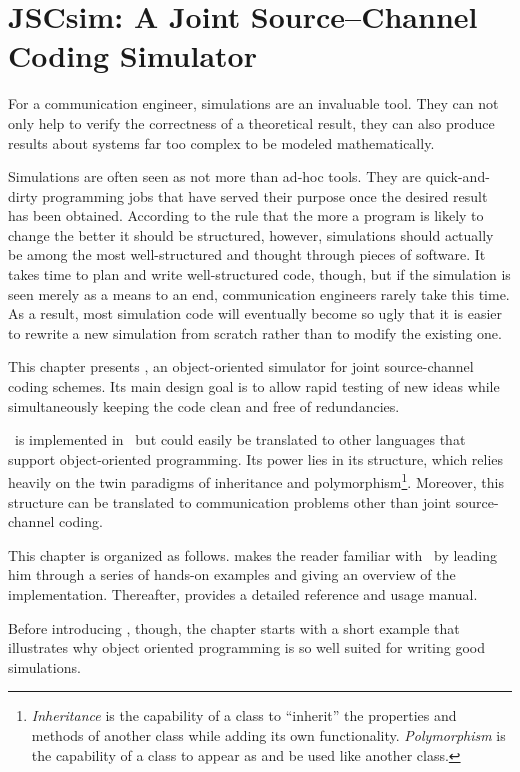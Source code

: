\chapter{JSCsim: A Joint Source--Channel Coding Simulator}
\label{ch:simulator}

For a communication engineer, simulations are an invaluable tool. They can not
only help to verify the correctness of a theoretical result, they can also
 produce results about systems far too complex to be modeled mathematically.

Simulations are often seen as not more than ad-hoc tools. They are
quick-and-dirty programming jobs that have served their purpose once the desired
result has been obtained. According to the rule that the more a program is
likely to change the better it should be structured, however, simulations should
actually be among the most well-structured and thought through pieces of
software. It takes time to plan and write well-structured code, though, but
if the simulation is seen merely as a means to an end, communication engineers
rarely take this time.  As a result, most simulation code will eventually become
so ugly that it is easier to rewrite a new simulation from scratch rather than
to modify the existing one. 

This chapter presents \jscsim, an object-oriented simulator for joint
source-channel coding schemes. Its main design goal is to allow rapid testing
of new ideas while simultaneously keeping the code clean and free of
redundancies. 

\jscsim\ is implemented in \matlab\ but could easily be translated to other
languages that support object-oriented programming. Its power lies in its
structure, which relies heavily on the twin paradigms of inheritance and
polymorphism\footnote{\emph{Inheritance} is the capability of a class to
``inherit'' the properties and methods of another class while adding its own
functionality. \emph{Polymorphism} is the capability of a class to appear as and
be used like another class.}. Moreover, this structure can be translated to
communication problems other than joint source-channel coding. 

This chapter is organized as follows.  makes the reader
familiar with \jscsim\ by leading him through a series of hands-on examples and
giving an overview of the implementation.  Thereafter, 
provides a detailed reference and usage manual.  

Before introducing \jscsim, though, the chapter starts with a short example that
illustrates why object oriented programming is so well suited for writing
good simulations.

